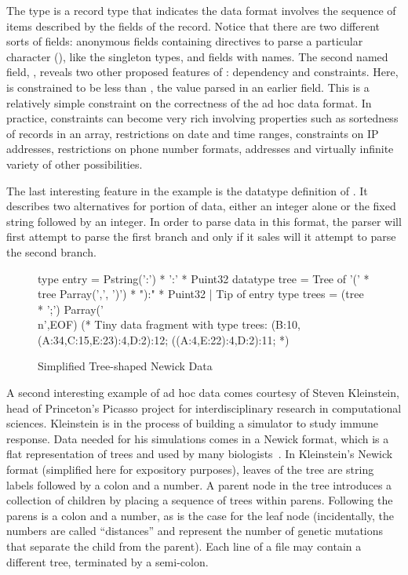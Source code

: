 \documentclass{entcs}
\begin{document}
The type  is a record type that indicates
the data format involves the sequence of items described by
the fields of the record.  Notice that there are two different
sorts of fields: anonymous fields containing directives to parse
a particular character (), like the singleton types,
and fields with names.  The second named field,
, reveals two other proposed features of 
\datatype: dependency and constraints.  Here,
 is constrained to be less than
, the value parsed in an earlier field.
This is a relatively simple constraint on the correctness of the
ad hoc data format.  In practice, constraints can become very rich
involving properties such as sortedness of records in an array,
restrictions on date and time ranges, constraints on IP addresses,
restrictions on phone number formats, addresses and virtually 
infinite variety of other possibilities. 

The last interesting feature in the \dibbler{} example is the
datatype definition of .  It describes
two alternatives for portion of data, either an integer alone
or the fixed string  followed by an integer.
In order to parse data in this format, the parser will
first attempt to parse the first branch and only if it
sales will it attempt to parse the second branch.

\begin{figure}
\begin{code}
type entry = Pstring(':') * ':' * Puint32
\mbox{}
datatype tree =
    Tree of '(' * tree Parray(',', ')') * "):" * Puint32
  | Tip of entry
\mbox{}
type trees = (tree * ';') Parray('\\n',EOF)
\mbox{}
(* Tiny data fragment with type trees:
\mbox{}
(B:10,(A:34,C:15,E:23):4,D:2):12;
((A:4,E:22):4,D:2):11;
\mbox{}
*)
\end{code}
\caption{Simplified Tree-shaped Newick Data}
\label{figure:newick}
\end{figure}

A second interesting example of ad hoc data comes courtesy of
Steven Kleinstein, head of Princeton's Picasso project for
interdisciplinary research in computational sciences.  
Kleinstein is in the process of 
building a simulator to study immune response.  Data
needed for his simulations comes in a Newick format, which is
a flat representation of trees and used by many biologists~\cite{newick}.  
In Kleinstein's Newick format (simplified
here for expository purposes), leaves of the
tree are string labels followed by a colon and a number.
A parent node in the tree introduces a collection of
children by placing a sequence of trees within parens.
Following the parens is a colon and a number, as is the case
for the leaf node (incidentally, the numbers are called ``distances''
and represent the number of genetic mutations that separate the
child from the parent).  Each line of a file may contain
a different tree, terminated by a semi-colon.
\end{document}

